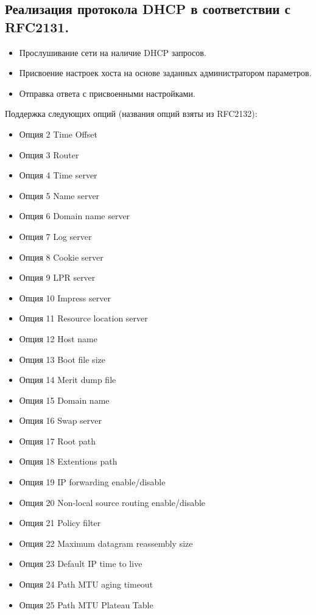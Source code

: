 \documentclass[14pt,a4paper]{extarticle}
\begin{document}
\subsection{Реализация протокола DHCP в соответствии с RFC2131.}
\begin{itemize}
    \item Прослушивание сети на наличие DHCP запросов.
    \item Присвоение настроек хоста на основе заданных администратором параметров.
    \item Отправка ответа с присвоенными настройками.
\end{itemize}

Поддержка следующих опций (названия опций взяты из RFC2132):
\begin{itemize}
    \item Опция 2 Time Offset
    \item Опция 3 Router
    \item Опция 4 Time server
    \item Опция 5 Name server
    \item Опция 6 Domain name server
    \item Опция 7 Log server
    \item Опция 8 Cookie server
    \item Опция 9 LPR server
    \item Опция 10 Impress server
    \item Опция 11 Resource location server
    \item Опция 12 Host name
    \item Опция 13 Boot file size
    \item Опция 14 Merit dump file
    \item Опция 15 Domain name
    \item Опция 16 Swap server
    \item Опция 17 Root path
    \item Опция 18 Extentions path
    \item Опция 19 IP forwarding enable/disable
    \item Опция 20 Non-local source routing enable/disable
    \item Опция 21 Policy filter
    \item Опция 22 Maximum datagram reassembly size
    \item Опция 23 Default IP time to live
    \item Опция 24 Path MTU aging timeout
    \item Опция 25 Path MTU Plateau Table

\end{itemize}
\end{document}
